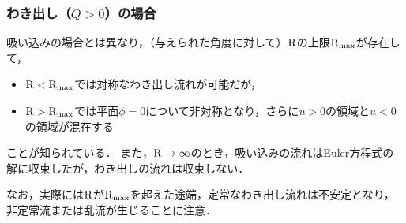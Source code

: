 



\subsubsection*{わき出し（$Q>0$）の場合}
吸い込みの場合とは異なり，（与えられた角度に対して）$\mathrm{R}$の上限$\mathrm{R}_\mathrm{max}$が存在して，
\begin{itemize}
    \item $\mathrm{R}<\mathrm{R}_\mathrm{max}$では対称なわき出し流れが可能だが，
    \item $\mathrm{R}>\mathrm{R}_\mathrm{max}$では平面$\phi=0$について非対称となり，さらに$u>0$の領域と$u<0$の領域が混在する
\end{itemize}
ことが知られている．
また，$\mathrm{R}\to\infty$のとき，吸い込みの流れはEuler方程式の解に収束したが，わき出しの流れは収束しない．



なお，実際には$\mathrm{R}$が$\mathrm{R}_\mathrm{max}$を超えた途端，定常なわき出し流れは不安定となり，非定常流または乱流が生じることに注意．

